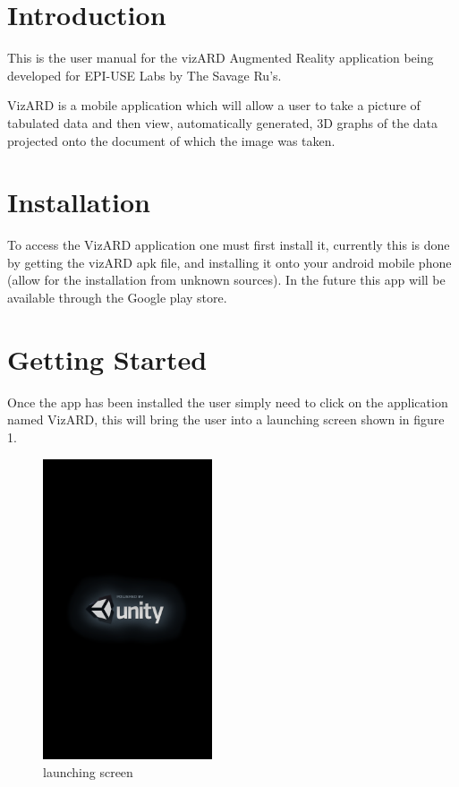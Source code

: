 \documentclass[a4paper,12pt]{article}
\begin{document}
\newpage

\tableofcontents

\newpage

\section{Introduction}

This is the user manual for the vizARD Augmented Reality application being developed for EPI-USE Labs by The Savage Ru's.

VizARD is a mobile application which will allow a user to take a picture of tabulated data and then view, automatically generated, 3D graphs of the data projected onto the document of which the image was taken.



\section{Installation}
To access the VizARD application one must first install it, currently this is done by getting the vizARD apk file, and installing it onto your android mobile phone (allow for the installation from unknown sources). In the future this app will be available through the Google play store.

\newpage

\section{Getting Started}
Once the app has been installed the user simply need to click on the application named VizARD, this will bring the user into a launching screen shown in figure 1.\\
\begin{figure}[H]
\centering
	\includegraphics[width=50mm]{images/launch.png}
	\caption{launching screen \label{overflow}}
\end{figure}
\end{document}
